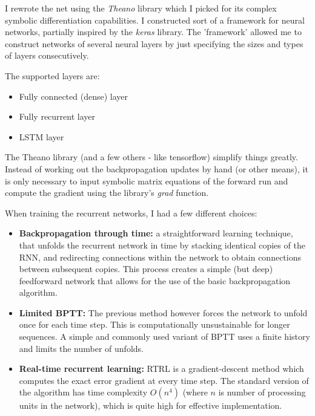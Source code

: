 \medskip

I rewrote the net using the \textit{Theano} library which I picked for its complex symbolic differentiation capabilities. I constructed sort of a framework for neural networks, partially inspired by the \textit{keras} library. The 'framework' allowed me to construct networks of several neural layers by just specifying the sizes and types of layers consecutively.

The supported layers are:
\begin{itemize}
\item Fully connected (dense) layer
\item Fully recurrent layer
\item LSTM layer
\end{itemize}

The Theano library (and a few others - like tensorflow) simplify things greatly. Instead of working out the backpropagation updates by hand (or other means), it is only necessary to input symbolic matrix equations of the forward run and compute the gradient using the library's \textit{grad} function.

\medskip

When training the recurrent networks, I had a few different choices:
\begin{itemize}
\item \textbf{Backpropagation through time:} a straightforward learning technique, that unfolds the recurrent network in time by stacking identical copies of the RNN, and redirecting connections within the network to obtain connections between subsequent copies. This process creates a simple (but deep) feedforward network that allows for the use of the basic backpropagation algorithm.

\item \textbf{Limited BPTT:} The previous method however forces the network to unfold once for each time step. This is computationally unsustainable for longer sequences. A simple and commonly used variant of BPTT uses a finite history and limits the number of unfolds.

\item \textbf{Real-time recurrent learning:} RTRL is a gradient-descent method which computes the exact error gradient at every time step. The standard version of the algorithm has time complexity $O(n^4)$ \cite{cite:RTRL-complexity} (where $n$ is number of processing units in the network), which is quite high for effective implementation.
\end{itemize}

